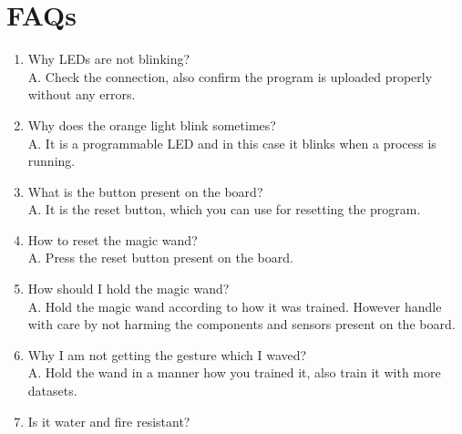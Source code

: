 %
%



\chapter{FAQs} 
\begin{enumerate}
	
	\item Why LEDs are not blinking?\\
	
	A. Check the connection, also confirm the program is uploaded properly without any errors.\\
	
	\item Why does the orange light blink sometimes?\\
	
	A. It is a programmable LED and in this case it blinks when a process is running.\\
	
	\item What is the button present on the board?\\
	
	A. It is the reset button, which you can use for resetting the program. \\
	
	\item How to reset the magic wand?\\
	
	A. Press the reset button present on the board. \\
	
	\item How should I hold the magic wand?\\
	
	A. Hold the magic wand according to how it was trained. However handle with care by not harming the components and sensors present on the board.\\
	
	\item Why I am not getting the gesture which I waved?\\
	
	A. Hold the wand in a manner how you trained it, also train it with more datasets.\\
	
	\item Is it water and fire resistant?\\
	

\end{enumerate}
